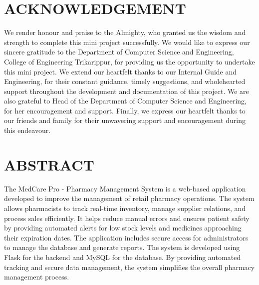 \documentclass[12pt, a4paper]{report}
\begin{document}
\chapter*{ACKNOWLEDGEMENT}
We render honour and praise to the Almighty, who granted us the wisdom and strength to complete this mini project successfully. We would like to express our sincere gratitude to the Department of Computer Science and Engineering, College of Engineering Trikarippur, for providing us the opportunity to undertake this mini project. We extend our heartfelt thanks to our Internal Guide and Engineering, for their constant guidance, timely suggestions, and wholehearted support throughout the development and documentation of this project. We are also grateful to Head of the Department of Computer Science and Engineering, for her encouragement and support. Finally, we express our heartfelt thanks to our friends and family for their unwavering support and encouragement during this endeavour.

\clearpage

\chapter*{ABSTRACT}
The MedCare Pro - Pharmacy Management System is a web-based application developed to improve the management of retail pharmacy operations. The system allows pharmacists to track real-time inventory, manage supplier relations, and process sales efficiently. It helps reduce manual errors and ensures patient safety by providing automated alerts for low stock levels and medicines approaching their expiration dates. The application includes secure access for administrators to manage the database and generate reports. The system is developed using Flask for the backend and MySQL for the database. By providing automated tracking and secure data management, the system simplifies the overall pharmacy management process.

\clearpage

\tableofcontents
\clearpage
\end{document}
